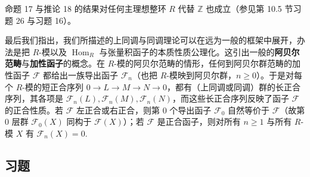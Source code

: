 命题 17 与推论 18 的结果对任何主理想整环 \(R\) 代替 \(\mathbb{Z}\) 也成立（参见第 10.5 节习题 26 与习题 16）。

最后我们指出，我们所描述的上同调与同调理论可以在远为一般的框架中展开，办法是把 \(R\)-模以及 \(\operatorname{Hom}_R\) 与张量积函子的本质性质公理化。这引出一般的\textbf{阿贝尔范畴}与\textbf{加性函子}的概念。在 \(R\)-模的阿贝尔范畴的情形，任何到阿贝尔群范畴的加性函子 \(\mathcal{F}\) 都给出一族导出函子 \(\mathcal{F}_n\)（也把 \(R\)-模映到阿贝尔群，\(n \geq 0\)）。于是对每个 \(R\)-模的短正合序列 \(0 \to L \to M \to N \to 0\)，都有（上同调或同调）群的长正合序列，其各项是 \(\mathcal{F}_n(L), \mathcal{F}_n(M), \mathcal{F}_n(N)\)，而这些长正合序列反映了函子 \(\mathcal{F}\) 的正合性质。若 \(\mathcal{F}\) 左正合或右正合，则第 0 个导出函子 \(\mathcal{F}_0\) 自然等价于 \(\mathcal{F}\)（故第 0 层群 \(\mathcal{F}_0(X)\) 同构于 \(\mathcal{F}(X)\)）；若 \(\mathcal{F}\) 是正合函子，则对所有 \(n \geq 1\) 与所有 \(R\)-模 \(X\) 有 \(\mathcal{F}_n(X) = 0\).

\subsection*{习题}

